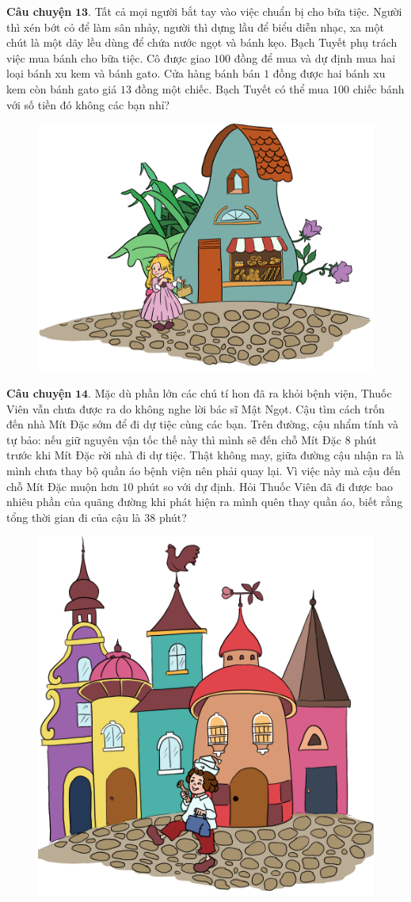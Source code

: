 	\vskip 0.1cm
	\textbf{\color{toancuabi}Câu chuyện} $\pmb{13.}$ Tất cả mọi người bắt tay vào việc chuẩn bị cho bữa tiệc. Người thì xén bớt cỏ để làm sân nhảy, người thì dựng lầu để biểu diễn nhạc, xa một chút là một dãy lều dùng để chứa nước ngọt và bánh kẹo. Bạch Tuyết phụ trách việc mua bánh cho bữa tiệc. Cô được giao $100$ đồng để mua và dự định mua hai loại bánh xu kem và bánh gato. Cửa hàng bánh bán $1$ đồng được hai bánh xu kem còn bánh gato giá $13$ đồng một chiếc. Bạch Tuyết có thể mua $100$ chiếc bánh với số tiền đó không các bạn nhỉ?
		\begin{figure}[H]
		\centering
		\vspace*{-5pt}
		\captionsetup{labelformat= empty, justification=centering}
		\includegraphics[width=0.6\linewidth]{Hinh15_BachTuyet}
		\vspace*{-10pt}
	\end{figure}
	\textbf{\color{toancuabi}Câu chuyện} $\pmb{14.}$ Mặc dù phần lớn các chú tí hon đã ra khỏi bệnh viện, Thuốc Viên vẫn chưa được ra do không nghe lời bác sĩ Mật Ngọt. Cậu tìm cách trốn đến nhà Mít Đặc sớm để đi dự tiệc cùng các bạn. Trên đường, cậu nhẩm tính và tự bảo: nếu giữ nguyên vận tốc thế này thì mình sẽ đến chỗ Mít Đặc $8$ phút trước khi Mít Đặc rời nhà đi dự tiệc. Thật không may, giữa đường cậu nhận ra là mình chưa thay bộ quần áo bệnh viện nên phải quay lại. Vì việc này mà cậu đến chỗ Mít Đặc muộn hơn $10$ phút so với dự định. Hỏi Thuốc Viên đã đi được bao nhiêu phần của quãng đường khi phát hiện ra mình quên thay quần áo, biết rằng tổng thời gian đi của cậu là $38$ phút?
	\begin{figure}[H]
		\centering
		\vspace*{-5pt}
		\captionsetup{labelformat= empty, justification=centering}
		\includegraphics[width=0.5\linewidth]{Hinh16_ThuocNuoc}
		\vspace*{-10pt}
	\end{figure}	
